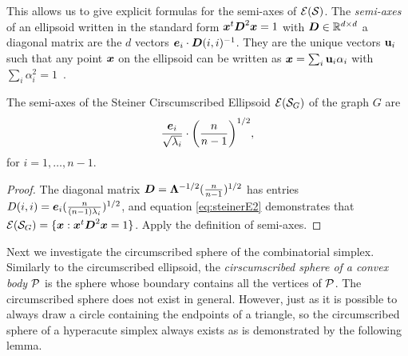 This allows us to give explicit formulas for the semi-axes of $\El(\splx)$.
 The \emph{semi-axes} of an ellipsoid written in the standard form $\x^\tp \D^2\x=1$ with $\D\in\R^{d\times d}$ a diagonal matrix are the $d$ vectors $\e_i\cdot \D(i,i)^{-1}$. They are the unique vectors $\u_i$ such that any  point $\x$ on the ellipsoid can be written as $\x=\sum_i \u_i\alpha_i$ with  $\sum_i\alpha_i^2=1$~\cite{devriendt2018simplex}. 
 
 \begin{lemma}
 	The semi-axes of the Steiner Cirscumscribed Ellipsoid  $\El(\splx_G)$ of  the graph $G$ are 
 	\[\frac{\e_i}{\sqrt{\lambda_i} }\cdot \bigg(\frac{n}{n-1}\bigg)^{1/2}, \]
 	for $i=1,\dots,n-1$. 
 \end{lemma}
\begin{proof}
	The diagonal matrix $\D=\Eval^{-1/2} (\frac{n}{n-1})^{1/2}$ has entries $D(i,i) = \e_i(\frac{n}{(n-1)\lambda_i})^{1/2}$, and equation  \eqref{eq:steinerE2} demonstrates  that  $\El(\splx_G) = \{\x:\x^\tp \D^2\x=1\}$. Apply the definition of semi-axes. 
\end{proof}

Next we investigate the circumscribed sphere of the combinatorial  simplex. Similarly to the circumscribed ellipsoid, the \emph{cirscumscribed sphere  of a convex body $\P$} is the sphere whose boundary contains all the vertices of $\P$. The circumscribed sphere does not exist in general. However, just as it is possible to always draw a circle containing the endpoints  of a triangle, so the circumscribed sphere of a hyperacute simplex always exists  as is demonstrated  by the following lemma.  

